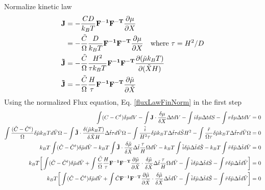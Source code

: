 \documentclass[12pt,3p]{article}
\numberwithin{equation}{section}
\begin{document}
Normalize kinetic law
\begin{align}\label{fluxLawFinNorm}
\begin{split}
\mathbf{J} &= - \frac{CD}{k_B T} \mathbf{F^{-1}} \mathbf{F^{-T}} \pdv{\mu}{X} \\
   		&= - \frac{\tilde{C}}{\Omega} \frac{D}{k_B T} \mathbf{F^{-1}} \mathbf{F^{-T}} \pdv{\mu}{X} \quad \text{where } \tau = H^2/D \\
\mathbf{\tilde{J}} &= - \frac{\tilde{C}}{\Omega} \frac{H^2}{\tau k_B T} \mathbf{F^{-1}} \mathbf{F^{-T}} \pdv{ (\tilde{\mu} k_B T) }{(\tilde{X} H)} \\
\mathbf{\tilde{J}} &= - \frac{\tilde{C}}{\Omega} \frac{H}{\tau} \mathbf{F^{-1}} \mathbf{F^{-T}} \pdv{ \tilde{\mu} }{\tilde{X}} \\
\end{split}
\end{align}
Using the normalized Flux equation, Eq. \ref{fluxLawFinNorm} in the first step 
\begin{align*}
\int (C - C^t) \delta \mu dV - \int \mathbf{J} \cdot \frac{\delta \mu}{\delta X} \Delta t dV - \int i \delta \mu \Delta t dS - \int r \delta \mu \Delta t dV &= 0 \\
\int \frac{(\tilde{C} - \tilde{C}^t)}{\Omega} \delta \tilde{\mu} k_B T d\tilde{V} \Omega - \int \mathbf{\tilde{J}} \cdot \frac{\delta (\tilde{\mu} k_B T)}{\delta \tilde{X} H} \Delta \tilde{t} \tau d \tilde{V} \Omega - \int \frac{\tilde{i}}{H^2 \tau} \delta \tilde{\mu} k_B T \Delta \tilde{t} \tau d\tilde{S} H^2 - \int \frac{\tilde{r}}{\Omega \tau} \delta \tilde{\mu} k_B T \Delta \tilde{t} \tau d \tilde{V} \Omega &= 0 \\
k_B T \int (\tilde{C} - \tilde{C}^t) \delta \tilde{\mu} d\tilde{V} - k_B T\int \mathbf{\tilde{J}} \cdot \frac{\delta \tilde{\mu}}{\delta \tilde{X}} \Delta \tilde{t} \frac{\tau}{H} \Omega d\tilde{V} - k_B T \int \tilde{i} \delta \tilde{\mu} \Delta \tilde{t} d\tilde{S} - k_B T \int \tilde{r} \delta \tilde{\mu}  \Delta \tilde{t} d \tilde{V} &= 0 \\
k_B T \bigg[ \int (\tilde{C} - \tilde{C}^t) \delta \tilde{\mu} d\tilde{V} + \int \frac{\tilde{C}}{\Omega} \frac{H}{\tau} \mathbf{F^{-1}} \mathbf{F^{-T}} \pdv{ \tilde{\mu} }{\tilde{X}} \cdot \frac{\delta \tilde{\mu}}{\delta \tilde{X}} \Delta \tilde{t} \frac{\tau}{H} \Omega d\tilde{V} - \int \tilde{i} \delta \tilde{\mu} \Delta \tilde{t} d\tilde{S} - \int \tilde{r} \delta \tilde{\mu}  \Delta \tilde{t} d \tilde{V} \bigg] &= 0 \\
k_B T \bigg[ \int (\tilde{C} - \tilde{C}^t) \delta \tilde{\mu} d\tilde{V} + \int \tilde{C} \mathbf{F^{-1}} \mathbf{F^{-T}} \pdv{ \tilde{\mu} }{\tilde{X}} \cdot \frac{\delta \tilde{\mu}}{\delta \tilde{X}} \Delta \tilde{t} d\tilde{V} - \int \tilde{i} \delta \tilde{\mu} \Delta \tilde{t} d\tilde{S} - \int \tilde{r} \delta \tilde{\mu}  \Delta \tilde{t} d \tilde{V} \bigg] &= 0 
\end{align*}
\end{document}
